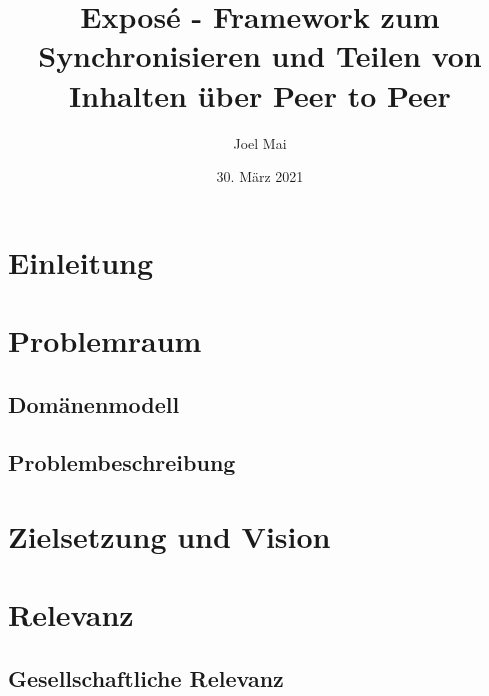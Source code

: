 \documentclass[10pt]{article}
\author{Joel Mai}
\title{Exposé - Framework zum Synchronisieren und Teilen von Inhalten über Peer to Peer}
\date{30. März 2021}
\begin{document}
    \maketitle 

    \newpage

    \section{Einleitung}\label{sec:Einleitung}

    \section{Problemraum}\label{sec:Problemraum}

        \subsection{Domänenmodell}\label{sec:Domaenenmodell}

        \subsection{Problembeschreibung}\label{sec:Problembeschreibung}

    \section{Zielsetzung und Vision}\label{sec:Zielsetzung}

    \section{Relevanz}\label{sec:Relevanz}

        \subsection{Gesellschaftliche Relevanz}\label{sec:Gesellschaftliche}
\end{document}
